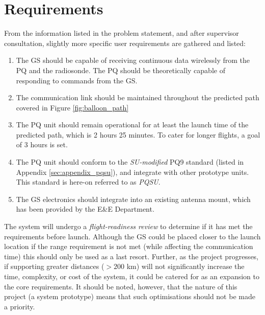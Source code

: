 \section{Requirements}

From the information listed in the problem statement, and after supervisor consultation, slightly more specific user requirements are gathered and listed:
\begin{enumerate}
    \item The GS should be capable of receiving continuous data wirelessly from the PQ and the radiosonde. The PQ should be theoretically capable of responding to commands from the GS.
    \item The communication link should be maintained throughout the predicted path covered in Figure \ref{fig:balloon_path}
    \item The PQ unit should remain operational for at least the launch time of the predicted path, which is 2 hours 25 minutes. To cater for longer flights, a goal of 3 hours is set.
    \item The PQ unit should conform to the \textit{SU-modified} PQ9 standard (listed in Appendix \ref{sec:appendix_pqsu}), and integrate with other prototype units. This standard is here-on referred to as \textit{PQSU}.
    \item The GS electronics should integrate into an existing antenna mount, which has been provided by the E\&E Department.
\end{enumerate}

The system will undergo a \textit{flight-readiness review} to determine if it has met the requirements before launch. Although the GS could be placed closer to the launch location if the range requirement is not met (while affecting the communication time) this should only be used as a last resort. Further, as the project progresses, if supporting greater distances ($> 200$ km) will not significantly increase the time, complexity, or cost of the system, it could be catered for as an expansion to the core requirements. It should be noted, however, that the nature of this project (a system prototype) means that such optimisations should not be made a priority.